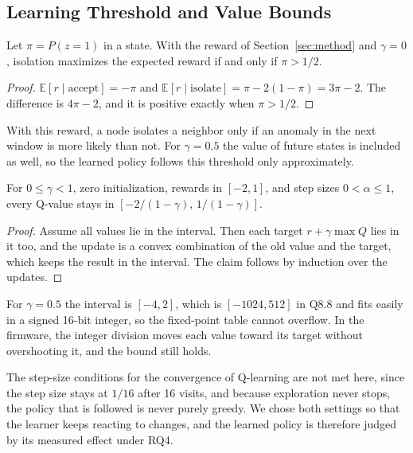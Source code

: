 \subsection{Learning Threshold and Value Bounds}
\begin{proposition}\label{prop:policy}
Let $\pi=P(z=1)$ in a state. With the reward of Section~\ref{sec:method} and $\gamma=0$, isolation maximizes the expected reward if and only if $\pi>1/2$.
\end{proposition}
\begin{proof}
$\mathbb{E}[r\mid\text{accept}]=-\pi$ and $\mathbb{E}[r\mid\text{isolate}]=\pi-2(1-\pi)=3\pi-2$. The difference is $4\pi-2$, and it is positive exactly when $\pi>1/2$.
\end{proof}
With this reward, a node isolates a neighbor only if an anomaly in the next window is more likely than not. For $\gamma=0.5$ the value of future states is included as well, so the learned policy follows this threshold only approximately.

\begin{proposition}\label{prop:qbound}
For $0\le\gamma<1$, zero initialization, rewards in $[-2,1]$, and step sizes $0<\alpha\le1$, every Q-value stays in $[-2/(1-\gamma),\,1/(1-\gamma)]$.
\end{proposition}
\begin{proof}
Assume all values lie in the interval. Then each target $r+\gamma\max Q$ lies in it too, and the update is a convex combination of the old value and the target, which keeps the result in the interval. The claim follows by induction over the updates.
\end{proof}
For $\gamma=0.5$ the interval is $[-4,2]$, which is $[-1024,512]$ in Q8.8 and fits easily in a signed 16-bit integer, so the fixed-point table cannot overflow. In the firmware, the integer division moves each value toward its target without overshooting it, and the bound still holds.

The step-size conditions for the convergence of Q-learning \cite{watkins1992} are not met here, since the step size stays at $1/16$ after 16 visits, and because exploration never stops, the policy that is followed is never purely greedy. We chose both settings so that the learner keeps reacting to changes, and the learned policy is therefore judged by its measured effect under RQ4.

